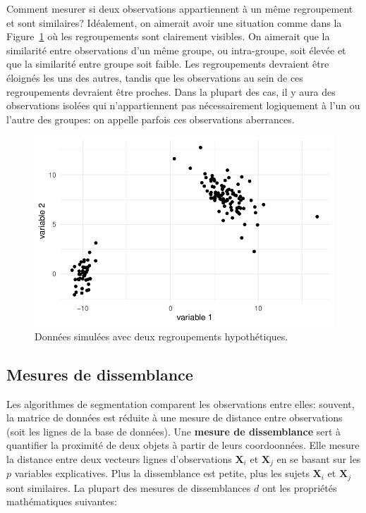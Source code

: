 \documentclass[
  11pt,
  letterpaper,
]{scrbook}
\theoremstyle{definition}
\theoremstyle{remark}
\begin{document}
Comment mesurer si deux observations appartiennent à un même
regroupement et sont similaires? Idéalement, on aimerait avoir une
situation comme dans la Figure~\ref{fig-regroupements-bidons} où les
regroupements sont clairement visibles. On aimerait que la similarité
entre observations d'un même groupe, ou intra-groupe, soit élevée et que
la similarité entre groupe soit faible. Les regroupements devraient être
éloignés les uns des autres, tandis que les observations au sein de ces
regroupements devraient être proches. Dans la plupart des cas, il y aura
des observations isolées qui n'appartiennent pas nécessairement
logiquement à l'un ou l'autre des groupes: on appelle parfois ces
observations aberrances.

\begin{figure}[ht!]

{\centering \includegraphics{./03-regroupements_files/figure-pdf/fig-regroupements-bidons-1.pdf}

}

\caption{\label{fig-regroupements-bidons}Données simulées avec deux
regroupements hypothétiques.}

\end{figure}

\hypertarget{mesures-de-dissemblance-1}{%
\subsection{Mesures de dissemblance}\label{mesures-de-dissemblance-1}}

Les algorithmes de segmentation comparent les observations entre elles:
souvent, la matrice de données est réduite à une mesure de distance
entre observations (soit les lignes de la base de données). Une
\textbf{mesure de dissemblance} sert à quantifier la proximité de deux
objets à partir de leurs coordoonnées. Elle mesure la distance entre
deux vecteurs lignes d'observations \(\mathbf{X}_i\) et \(\mathbf{X}_j\)
en se basant sur les \(p\) variables explicatives. Plus la dissemblance
est petite, plus les sujets \(\mathbf{X}_i\) et \(\mathbf{X}_j\) sont
similaires. La plupart des mesures de dissemblances \(d\) ont les
propriétés mathématiques suivantes:
\end{document}
